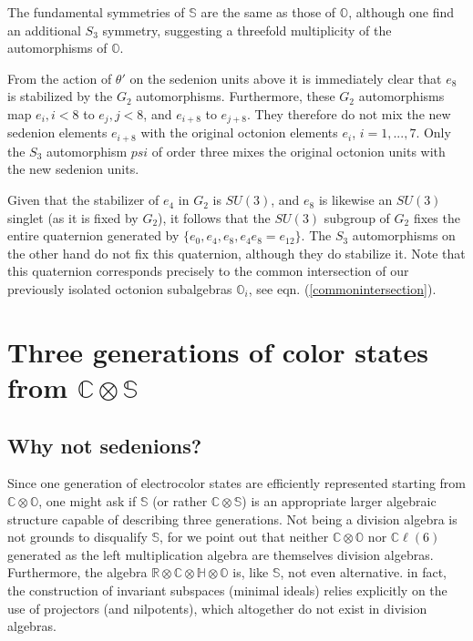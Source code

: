 \documentclass{article}
\newcommand{\bb}[1]{\mathbb{#1}}
\begin{document}
The fundamental symmetries of $\bb{S}$ are the same as those of $\bb{O}$, although one find an additional $S_3$ symmetry, suggesting a threefold multiplicity of the automorphisms of $\bb{O}$. %

From the action of $\theta'$ on the sedenion units above it is immediately clear that $e_8$ is stabilized by the $G_2$ automorphisms. Furthermore, these $G_2$ automorphisms map $e_i, i<8$ to $e_j, j<8$, and $e_{i+8}$ to $e_{j+8}$. They therefore do not mix the new sedenion elements $e_{i+8}$ with the original octonion elements $e_i$, $i=1,...,7$. Only the $S_3$ automorphism $psi$ of order three mixes the original octonion units with the new sedenion units. 

Given that the stabilizer of $e_4$ in $G_2$ is $SU(3)$, and $e_8$ is likewise an $SU(3)$ singlet (as it is fixed by $G_2$), it follows that the $SU(3)$ subgroup of $G_2$ fixes the entire quaternion generated by $\{e_0,e_4,e_8,e_4e_8=e_{12}\}$. The $S_3$ automorphisms on the other hand do not fix this quaternion, although they do stabilize it. Note that this quaternion corresponds precisely to the common intersection of our previously isolated octonion subalgebras $\bb{O}_i$, see eqn. (\ref{commonintersection}).



\section{Three generations of color states from $\bb{C}\otimes\bb{S}$}\label{sedenionmodel}

\subsection{Why not sedenions?}
Since one generation of electrocolor states are efficiently represented starting from $\bb{C}\otimes\bb{O}$, one might ask if $\bb{S}$ (or rather $\bb{C}\otimes\bb{S}$) is an appropriate larger algebraic structure capable of describing three generations. Not being a division algebra is not grounds to disqualify $\bb{S}$, for we point out that neither $\bb{C}\otimes\bb{O}$ nor $\bb{C}\ell(6)$ generated as the left multiplication algebra are themselves division algebras. Furthermore, the algebra $\bb{R}\otimes\bb{C}\otimes\bb{H}\otimes\bb{O}$ is, like $\bb{S}$, not even alternative. in fact, the construction of invariant subspaces (minimal ideals) relies explicitly on the use of projectors (and nilpotents), which altogether do not exist in division algebras.
\end{document}
